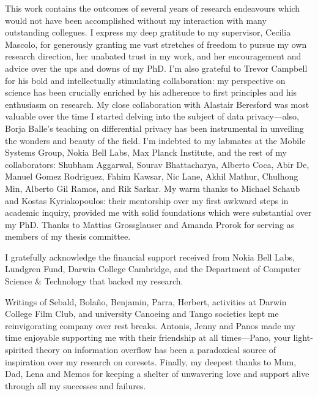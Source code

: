 
\begin{acknowledgements}
This work contains the outcomes of several years of research endeavours which would not have been accomplished without my interaction with many outstanding collegues. I express my deep gratitude to my supervisor, Cecilia Mascolo, for generously granting me vast stretches of freedom to pursue my own research direction, her unabated trust in my work, and her encouragement and advice over the ups and downs of my PhD. I'm also grateful to Trevor Campbell for his bold and intellectually stimulating collaboration: my perspective on science has been crucially enriched by his adherence to first principles and his enthusiasm on research. My close collaboration with Alastair Beresford was most valuable over the time I started delving into the subject of data privacy---also, Borja Balle's teaching on differential privacy has been instrumental in unveiling the wonders and beauty of the field. 
I'm indebted to my labmates at the Mobile Systems Group, Nokia Bell Labs, Max Planck Institute, and the rest of my collaborators:
Shubham Aggarwal, Sourav Bhattacharya, Alberto Coca, Abir De, Manuel Gomez Rodriguez, Fahim Kawsar, Nic Lane,  Akhil Mathur, Chulhong Min, Alberto Gil Ramos, and Rik Sarkar. My warm thanks to Michael Schaub and Kostas Kyriakopoulos: their mentorship over my first awkward steps in academic inquiry, provided me with solid foundations which were substantial over my PhD. Thanks to
Mattias Grossglauser and Amanda Prorok for serving as members of my thesis committee.

I gratefully acknowledge the financial support received from Nokia Bell Labs, Lundgren Fund, Darwin College Cambridge, and the Department of Computer Science \& Technology that backed my research. 

Writings of Sebald, Bola{\~{n}}o, Benjamin, Parra, Herbert, activities at Darwin College Film Club, and university Canoeing and Tango societies kept me reinvigorating company over rest breaks. Antonis, Jenny and Panos made my time enjoyable supporting me with their friendship at all times---Pano, your light-spirited theory on information overflow has been a paradoxical source of inspiration over my research on coresets. Finally, my deepest thanks to Mum, Dad, Lena and Memos for keeping a shelter of unwavering love and support alive through all my successes and failures.
\end{acknowledgements}
